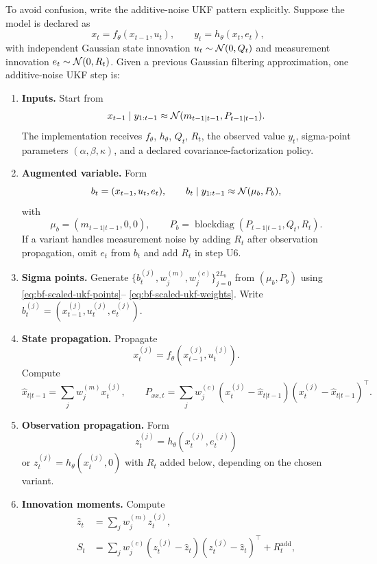 To avoid confusion, write the additive-noise UKF pattern explicitly.  Suppose
the model is declared as
\begin{equation}
  x_t = f_\theta(x_{t-1},u_t),
  \qquad
  y_t = h_\theta(x_t,e_t),
\end{equation}
with independent Gaussian state innovation $u_t\sim\mathcal{N}(0,Q_t)$ and
measurement innovation $e_t\sim\mathcal{N}(0,R_t)$.  Given a previous Gaussian
filtering approximation, one additive-noise UKF step is:
\begin{enumerate}[label=\textbf{U\arabic*.}]
  \item \textbf{Inputs.}  Start from
    \[
      x_{t-1}\mid y_{1:t-1} \approx \mathcal{N}(m_{t-1|t-1},P_{t-1|t-1}).
    \]
    The implementation receives $f_\theta$, $h_\theta$, $Q_t$, $R_t$, the
    observed value $y_t$, sigma-point parameters
    $(\alpha,\beta,\kappa)$, and a declared covariance-factorization policy.
  \item \textbf{Augmented variable.}  Form
    \[
      b_t=(x_{t-1},u_t,e_t),
      \qquad
      b_t\mid y_{1:t-1}\approx \mathcal{N}(\mu_b,P_b),
    \]
    with
    \[
      \mu_b=(m_{t-1|t-1},0,0),\qquad
      P_b=\operatorname{blockdiag}(P_{t-1|t-1},Q_t,R_t).
    \]
    If a variant handles measurement noise by adding $R_t$ after observation
    propagation, omit $e_t$ from $b_t$ and add $R_t$ in step U6.
  \item \textbf{Sigma points.}  Generate
    $\{b_t^{(j)},w_j^{(m)},w_j^{(c)}\}_{j=0}^{2L_b}$ from
    $(\mu_b,P_b)$ using \eqref{eq:bf-scaled-ukf-points}--%
    \eqref{eq:bf-scaled-ukf-weights}.  Write
    $b_t^{(j)}=(x_{t-1}^{(j)},u_t^{(j)},e_t^{(j)})$.
  \item \textbf{State propagation.}  Propagate
    \[
      x_t^{(j)}=f_\theta(x_{t-1}^{(j)},u_t^{(j)}).
    \]
    Compute
    \[
      \hat x_{t|t-1}=\sum_j w_j^{(m)}x_t^{(j)},\qquad
      P_{xx,t}=\sum_j w_j^{(c)}
      (x_t^{(j)}-\hat x_{t|t-1})(x_t^{(j)}-\hat x_{t|t-1})^\top .
    \]
  \item \textbf{Observation propagation.}  Form
    \[
      z_t^{(j)}=h_\theta(x_t^{(j)},e_t^{(j)})
    \]
    or $z_t^{(j)}=h_\theta(x_t^{(j)},0)$ with $R_t$ added below, depending on
    the chosen variant.
  \item \textbf{Innovation moments.}  Compute
    \begin{align}
      \hat z_t &= \sum_j w_j^{(m)}z_t^{(j)},\\
      S_t &=
        \sum_j w_j^{(c)}(z_t^{(j)}-\hat z_t)(z_t^{(j)}-\hat z_t)^\top
        + R_t^{\mathrm{add}},\\

\end{align}
\end{enumerate}
